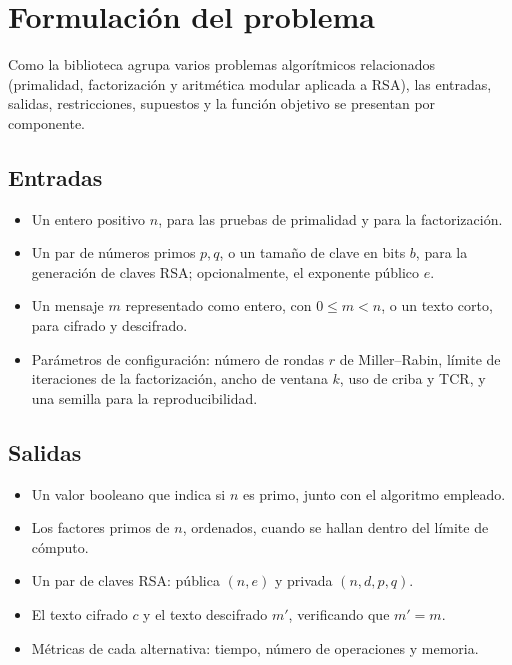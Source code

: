\section{Formulación del problema}
\label{sec:formulacion}

Como la biblioteca agrupa varios problemas algorítmicos relacionados
(primalidad, factorización y aritmética modular aplicada a RSA), las
entradas, salidas, restricciones, supuestos y la función objetivo se
presentan por componente.

\subsection{Entradas}
\begin{itemize}
  \item Un entero positivo $n$, para las pruebas de primalidad y para la factorización.
  \item Un par de números primos $p, q$, o un tamaño de clave en bits $b$, para
        la generación de claves RSA; opcionalmente, el exponente público $e$.
  \item Un mensaje $m$ representado como entero, con $0 \le m < n$, o un texto corto, para cifrado y descifrado.
  \item Parámetros de configuración: número de rondas $r$ de Miller--Rabin, límite de
        iteraciones de la factorización, ancho de ventana $k$, uso de criba y TCR, y una
        semilla para la reproducibilidad.
\end{itemize}

\subsection{Salidas}
\begin{itemize}
  \item Un valor booleano que indica si $n$ es primo, junto con el algoritmo empleado.
  \item Los factores primos de $n$, ordenados, cuando se hallan dentro del límite de cómputo.
  \item Un par de claves RSA: pública $(n, e)$ y privada $(n, d, p, q)$.
  \item El texto cifrado $c$ y el texto descifrado $m'$, verificando que $m' = m$.
  \item Métricas de cada alternativa: tiempo, número de operaciones y memoria.
\end{itemize}

